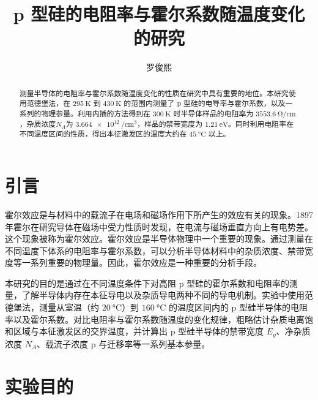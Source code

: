 \documentclass[font=default]{mpltx}
\begin{document}
\title{p 型硅的电阻率与霍尔系数随温度变化的研究} %
\author{罗俊熙} %
\date{}
\begin{abstract}
	测量半导体的电阻率与霍尔系数随温度变化的性质在研究中具有重要的地位。本研究使用范德堡法，在 $\qty{295}{\K}$ 到 $\qty{430}{\K}$ 的范围内测量了 p 型硅的电导率与霍尔系数，以及一系列的物理参量。利用内插的方法得到在 $\qty{300}{\K}$ 时半导体样品的电阻率为 $\qty{3553.6}{\ohm\per\cm}$，杂质浓度$N_A$为 $\qty{3.664e12}{\per\cubic\cm}$，样品的禁带宽度为 $\qty{1.21}{\eV}$。同时利用电阻率在不同温度区间的性质，得出本征激发区的温度大约在 $\qty{45}{\degreeCelsius}$ 以上。
\end{abstract}

\maketitle

\section{引言}
霍尔效应是与材料中的载流子在电场和磁场作用下所产生的效应有关的现象。1897年霍尔在研究导体在磁场中受力性质时发现，在电流与磁场垂直方向上有电势差。这个现象被称为霍尔效应。霍尔效应是半导体物理中一个重要的现象。通过测量在不同温度下体系的电阻率与霍尔系数，可以分析半导体材料中的杂质浓度、禁带宽度等一系列重要的物理量。因此，霍尔效应是一种重要的分析手段。

本研究的目的是通过在不同温度条件下对高阻 p 型硅的霍尔系数和电阻率的测量，了解半导体内存在本征导电以及杂质导电两种不同的导电机制。实验中使用范德堡法，测量从室温（约 $\qty{20}{\degreeCelsius}$）到 $\qty{160}{\degreeCelsius}$ 的温度区间内的 p 型硅半导体的电阻率以及霍尔系数。对比电阻率与霍尔系数随温度的变化规律，粗略估计杂质电离饱和区域与本征激发区的交界温度，并计算出 p 型硅半导体的禁带宽度 $E_g$、净杂质浓度 $N_A$、载流子浓度 p 与迁移率等一系列基本参量。
\section{实验目的}
\end{document}
